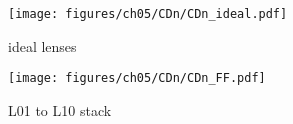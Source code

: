 \documentclass{article}
\begin{document}
\begin{figure}[h]
        \centering
        \texttt{[image: figures/ch05/CDn/CDn\_ideal.pdf]}\vspace{0.1cm}
        \caption*{\large{ideal lenses}}
\end{figure}
\begin{figure}[h]
        \centering
        \texttt{[image: figures/ch05/CDn/CDn\_FF.pdf]}\vspace{0.1cm}
        \caption*{\large{L01 to L10 stack}}
\end{figure}
\end{document}
